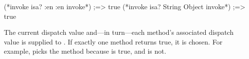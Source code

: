 \begin{cljlisting}
(*invoke isa? :en :en invoke*)       ;=> true
(*invoke isa? String Object invoke*) ;=> true
\end{cljlisting}

The current dispatch value and---in turn---each method's associated dispatch value
is supplied to . If exactly one method returns true, it is chosen.
For example,
picks the  method because 
is true, and
is not.
%

%
%
%

%
%
%

